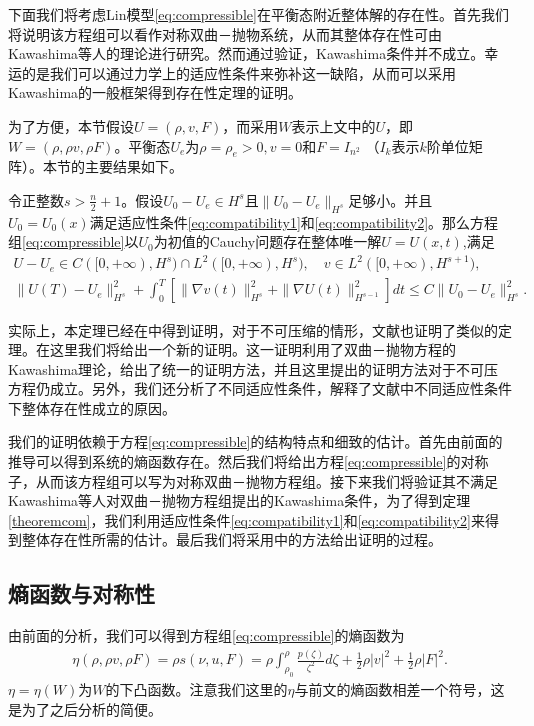 下面我们将考虑Lin模型\eqref{eq:compressible}在平衡态附近整体解的存在性。首先我们将说明该方程组可以看作对称双曲－抛物系统，从而其整体存在性可由Kawashima等人的理论\cite{kawashima1984systems,kawashima1985systems,yong2004entropy}进行研究。然而通过验证，Kawashima条件并不成立。幸运的是我们可以通过力学上的适应性条件来弥补这一缺陷，从而可以采用Kawashima的一般框架得到存在性定理的证明。

为了方便，本节假设$U = (\rho, v ,F)$，而采用$W$表示上文中的$U$，即$W=(\rho, \rho v ,\rho F)$。平衡态$U_e$为$\rho=\rho_e>0,  v =0 $和$F=I_{n^2}$ （$I_k$表示$k$阶单位矩阵）。本节的主要结果如下。
\begin{theorem}\label{theoremcom}
令正整数$s > \frac{n}{2}+1$。假设$U_0-U_e\in H^s$且$\|U_0-U_e\|_{H^s}$足够小。并且$U_0 = U_0(x)$满足适应性条件\eqref{eq:compatibility1}和\eqref{eq:compatibility2}。那么方程组\eqref{eq:compressible}以$U_0$为初值的Cauchy问题存在整体唯一解$U=U(x,t)$,满足
    \begin{eqnarray}\label{eq:thmincom}
       U - U_e\in C([0,+\infty), H^s) \cap L^2([0,+\infty), H^{s}), \nonumber \quad
         v \in L^2([0,+\infty), H^{s+1}),\\[2mm]
      \|U(T)-U_e\|_{H^s}^2 +  \int_0^T \left[\|\nabla  v (t) \|_{H^s}^2 + \|\nabla U(t)\|_{H^{s-1}}^2\right] dt
      \le C \|U_0-U_e\|_{H^s}^2 .
    \end{eqnarray}
\end{theorem}

实际上，本定理已经在\cite{qian2010global,hu2011global}中得到证明，对于不可压缩的情形，文献\cite{lin2005hydrodynamics,lei2008global,chen2006global}也证明了类似的定理。在这里我们将给出一个新的证明。这一证明利用了双曲－抛物方程的Kawashima理论，给出了统一的证明方法，并且这里提出的证明方法对于不可压方程仍成立。另外，我们还分析了不同适应性条件，解释了文献\cite{lin2005hydrodynamics,lei2008global,chen2006global,qian2010global,hu2011global}中不同适应性条件下整体存在性成立的原因。

我们的证明依赖于方程\eqref{eq:compressible}的结构特点和细致的估计。首先由前面的推导可以得到系统的熵函数存在。然后我们将给出方程\eqref{eq:compressible}的对称子，从而该方程组可以写为对称双曲－抛物方程组。接下来我们将验证其不满足Kawashima等人对双曲－抛物方程组提出的Kawashima条件，为了得到定理\ref{theoremcom}，我们利用适应性条件\eqref{eq:compatibility1}和\eqref{eq:compatibility2}来得到整体存在性所需的估计。最后我们将采用\cite{kawashima1984systems,yong2004entropy}中的方法给出证明的过程。

\subsection{熵函数与对称性}
由前面的分析，我们可以得到方程组\eqref{eq:compressible}的熵函数为
\begin{eqnarray}\label{22}
  \eta(\rho,\rho  v ,\rho F) = \rho s(\nu,u,F) =  \rho \int_{\rho_0}^\rho \frac{p(\zeta)}{\zeta^2} d\zeta + \frac{1}{2} \rho | v |^2 + \frac{1}{2} \rho |F|^2.
\end{eqnarray}
$\eta = \eta(W)$为$W$的下凸函数。注意我们这里的$\eta$与前文的熵函数相差一个符号，这是为了之后分析的简便。

